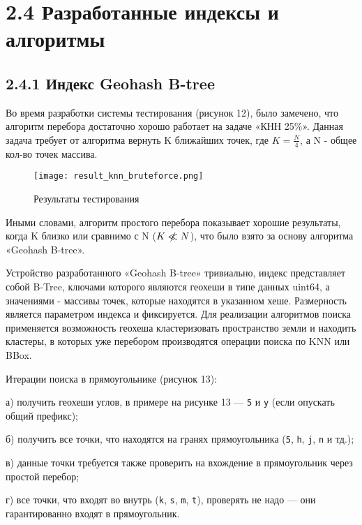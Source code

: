 \section{2.4 Разработанные индексы и алгоритмы}

\subsection{2.4.1 Индекс Geohash B-tree}
Во время разработки системы тестирования (рисунок 12), было замечено, что алгоритм перебора достаточно хорошо работает на задаче «КНН 25\%». Данная задача требует от алгоритма вернуть K ближайших точек, где $K = \frac{N}{4}$, а N - общее кол-во точек массива. 

\par\vspace{1em}
\begin{figure}[H]
    \centering
    \texttt{[image: result\_knn\_bruteforce.png]}
    \caption{Результаты тестирования}
\end{figure}
\par\vspace{1em}
 
Иными словами, алгоритм простого перебора показывает хорошие результаты, когда K близко или сравнимо с N ($K \centernot \ll N$), что было взято за основу алгоритма «Geohash B-tree». 

Устройство разработанного «Geohash B-tree» тривиально, индекс представляет собой B-Tree\cite{comerBTree}, ключами которого являются геохеши в типе данных uint64, а значениями - массивы точек, которые находятся в указанном хеше. Размерность является параметром индекса и фиксируется. Для реализации алгоритмов поиска применяется возможность геохеша кластеризовать пространство земли и находить кластеры, в которых уже перебором производятся операции поиска по KNN или BBox\cite{gulakovStructured}.

Итерации поиска в прямоугольнике (рисунок 13):
\par а) получить геохеши углов, в примере на рисунке 13 --- \texttt{5} и \texttt{y} (если опускать общий префикс);
\par б) получить все точки, что находятся на гранях прямоугольника (\texttt{5}, \texttt{h}, \texttt{j}, \texttt{n} и тд.);
\par в) данные точки требуется также проверить на вхождение в прямоугольник через простой перебор;
\par г) все точки, что входят во внутрь (\texttt{k}, \texttt{s}, \texttt{m}, \texttt{t}), проверять не надо --- они гарантированно входят в прямоугольник.

